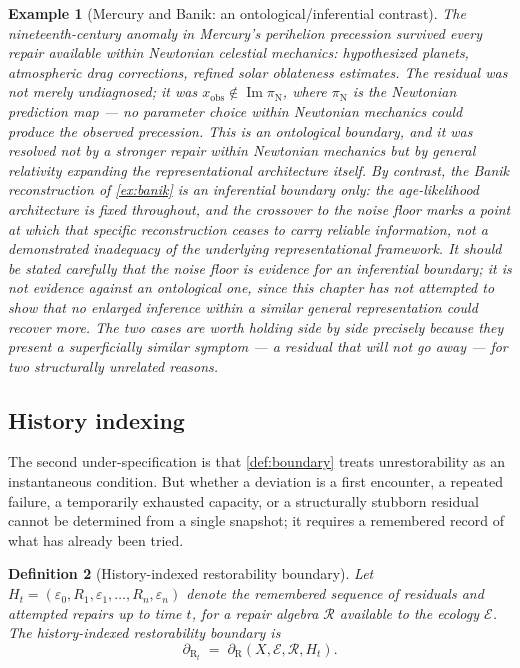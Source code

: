 \documentclass[12pt]{report}
\newtheorem{definition}{Definition}[section]
\newtheorem{example}[definition]{Example}
\newcommand{\Rboundary}[1][]{\ensuremath{\partial_{\mathrm{R}#1}}}
\begin{document}
\begin{example}[Mercury and Banik: an ontological/inferential contrast]
\label{ex:mercury}
The nineteenth-century anomaly in Mercury's perihelion precession survived
every repair available within Newtonian celestial mechanics: hypothesized
planets, atmospheric drag corrections, refined solar oblateness estimates.
The residual was not merely undiagnosed; it was $x_{\mathrm{obs}} \notin
\operatorname{Im}\pi_{\mathrm{N}}$, where $\pi_{\mathrm{N}}$ is the
Newtonian prediction map --- no parameter choice within Newtonian
mechanics could produce the observed precession. This is an ontological
boundary, and it was resolved not by a stronger repair within Newtonian
mechanics but by general relativity expanding the representational
architecture itself. By contrast, the Banik reconstruction of
\cref{ex:banik} is an inferential boundary only: the age-likelihood
architecture is fixed throughout, and the crossover to the noise floor
marks a point at which that specific reconstruction ceases to carry
reliable information, not a demonstrated inadequacy of the underlying
representational framework. It should be stated carefully that the noise
floor is evidence for an inferential boundary; it is not evidence against
an ontological one, since this chapter has not attempted to show that no
enlarged inference within a similar general representation could recover
more. The two cases are worth holding side by side precisely because they
present a superficially similar symptom --- a residual that will not go
away --- for two structurally unrelated reasons.
\end{example}

\subsection{History indexing}

The second under-specification is that \cref{def:boundary} treats
unrestorability as an instantaneous condition. But whether a deviation is
a first encounter, a repeated failure, a temporarily exhausted capacity,
or a structurally stubborn residual cannot be determined from a single
snapshot; it requires a remembered record of what has already been tried.

\begin{definition}[History-indexed restorability boundary]
\label{def:boundary-history}
Let $H_t = (\varepsilon_0, R_1, \varepsilon_1, \ldots, R_n, \varepsilon_n)$
denote the remembered sequence of residuals and attempted repairs up to
time $t$, for a repair algebra $\mathcal{R}$ available to the ecology
$\mathcal{E}$. The history-indexed restorability boundary is
\[
\Rboundary[_{t}] \;=\; \Rboundary(X, \mathcal{E}, \mathcal{R}, H_t).
\]
\end{definition}
\end{document}
